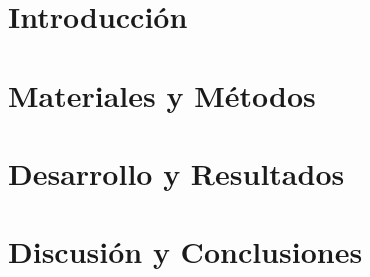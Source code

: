 \documentclass[11pt,a4paper,twoside]{tesis}
\begin{document}

\def\autor{Martín Ezequiel Langberg}
\def\tituloTesis{Predicción de patogenicidad en Polimorfismos de un Sólo Nucleótido usando Aprendizaje Automático}
\def\runtitulo{Predicción de patogenicidad en Polimorfismos de un Sólo Nucleótido usando Aprendizaje Automático}
\def\director{Ariel Berenstein}
\def\codirector{Pablo Turjanski}
\def\lugar{Buenos Aires, 2018}


\frontmatter
\pagestyle{empty}





\cleardoublepage
\tableofcontents

\mainmatter
\pagestyle{headings}


\chapter{Introducción}
\label{ch:introduccion}


\chapter{Materiales y Métodos}
\label{ch:materiales}


\chapter{Desarrollo y Resultados}
\label{ch:desarrollo}


\chapter{Discusión y Conclusiones}
\label{ch:conclusiones}






\backmatter




\end{document}
